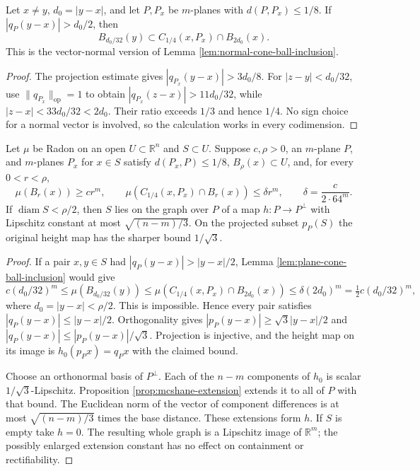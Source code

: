 \begin{lemma}\label{lem:plane-cone-ball-inclusion}
Let $x\ne y$, $d_0=|y-x|$, and let $P,P_x$ be $m$-planes with $d(P,P_x)\leq1/8$. If $|q_P(y-x)|>d_0/2$, then
\[
 B_{d_0/32}(y)\subset C_{1/4}(x,P_x)\cap B_{2d_0}(x).
\]
This is the vector-normal version of Lemma \ref{lem:normal-cone-ball-inclusion}.
\end{lemma}
\begin{proof}
The projection estimate gives $|q_{P_x}(y-x)|>3d_0/8$. For $|z-y|<d_0/32$, use $\|q_{P_x}\|_{\mathrm{op}}=1$ to obtain $|q_{P_x}(z-x)|>11d_0/32$, while $|z-x|<33d_0/32<2d_0$. Their ratio exceeds $1/3$ and hence $1/4$. No sign choice for a normal vector is involved, so the calculation works in every codimension.
\end{proof}

\begin{proposition}\label{prop:uniform-plane-cone-graph}
Let $\mu$ be Radon on an open $U\subset\mathbb R^n$ and $S\subset U$. Suppose $c,\rho>0$, an $m$-plane $P$, and $m$-planes $P_x$ for $x\in S$ satisfy $d(P_x,P)\leq1/8$, $B_\rho(x)\subset U$, and, for every $0<r<\rho$,
\[
 \mu(B_r(x))\geq cr^m,\qquad
 \mu(C_{1/4}(x,P_x)\cap B_r(x))\leq\delta r^m,
 \qquad \delta=\frac{c}{2\cdot64^m}.
\]
If $\operatorname{diam}S<\rho/2$, then $S$ lies on the graph over $P$ of a map $h:P\to P^\perp$ with Lipschitz constant at most $\sqrt{(n-m)/3}$. On the projected subset $p_P(S)$ the original height map has the sharper bound $1/\sqrt3$.
\end{proposition}
\begin{proof}
If a pair $x,y\in S$ had $|q_P(y-x)|>|y-x|/2$, Lemma \ref{lem:plane-cone-ball-inclusion} would give
\[
 c(d_0/32)^m\leq\mu(B_{d_0/32}(y))
 \leq\mu(C_{1/4}(x,P_x)\cap B_{2d_0}(x))
 \leq\delta(2d_0)^m=\tfrac12c(d_0/32)^m,
\]
where $d_0=|y-x|<\rho/2$. This is impossible. Hence every pair satisfies $|q_P(y-x)|\leq|y-x|/2$. Orthogonality gives $|p_P(y-x)|\geq\sqrt3|y-x|/2$ and $|q_P(y-x)|\leq|p_P(y-x)|/\sqrt3$. Projection is injective, and the height map on its image is $h_0(p_Px)=q_Px$ with the claimed bound.

Choose an orthonormal basis of $P^\perp$. Each of the $n-m$ components of $h_0$ is scalar $1/\sqrt3$-Lipschitz. Proposition \ref{prop:mcshane-extension} extends it to all of $P$ with that bound. The Euclidean norm of the vector of component differences is at most $\sqrt{(n-m)/3}$ times the base distance. These extensions form $h$. If $S$ is empty take $h=0$. The resulting whole graph is a Lipschitz image of $\mathbb R^m$; the possibly enlarged extension constant has no effect on containment or rectifiability.
\end{proof}

